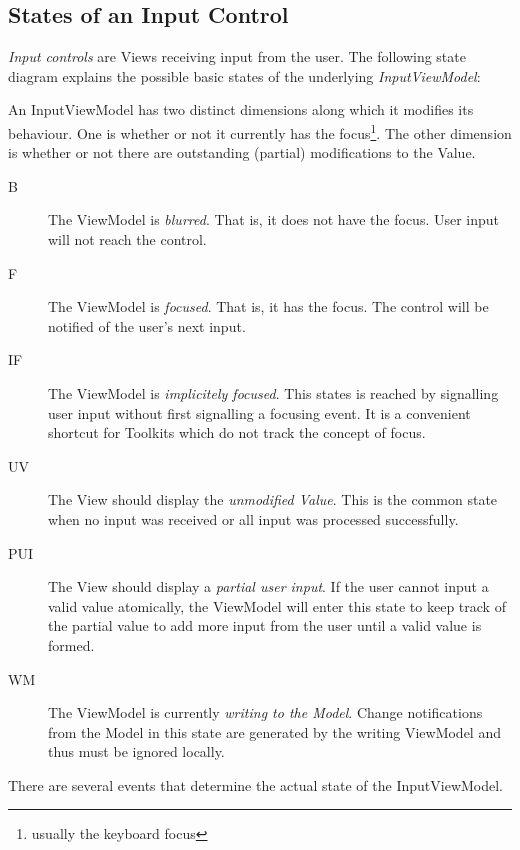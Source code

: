 \subsection{States of an Input Control}

\emph{Input controls} are Views receiving input from the user. The following state diagram 
explains the possible basic states of the underlying \emph{InputViewModel}:



An InputViewModel has two distinct dimensions along which it modifies its behaviour. One is 
whether or not it currently has the focus\footnote{usually the keyboard focus}. The other 
dimension is whether or not there are outstanding (partial) modifications to the Value.

\begin{description}
\item[B] {The ViewModel is \emph{blurred}. That is, it does not have the focus. User input will not reach the control.}
\item[F] {The ViewModel is \emph{focused}. That is, it has the focus. The control will be notified of the user's next input.}
\item[IF] {The ViewModel is \emph{implicitely focused}. This states is reached by signalling user input without first signalling a focusing event. It is a convenient shortcut for Toolkits which do not track the concept of focus.}

\item[UV] {The View should display the \emph{unmodified Value}. This is the common state when no input was received or all input was processed successfully.}
\item[PUI] {The View should display a \emph{partial user input}. If the user cannot input a valid value atomically, the ViewModel will enter this state to keep track of the partial value to add more input from the user until a valid value is formed.}
\item[WM] {The ViewModel is currently \emph{writing to the Model}. Change notifications from the Model in this state are generated by the writing ViewModel and thus must be ignored locally.}
\end{description}

There are several events that determine the actual state of the InputViewModel.

